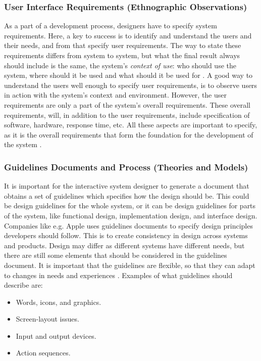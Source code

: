 \subsubsection{User Interface Requirements (Ethnographic Observations)}   
As a part of a development process, designers have to specify system requirements. Here, a key to success is to identify and understand the users and their needs, and from that specify user requirements. The way to state these requirements differs from system to system, but what the final result always should include is the same, the system's \emph{context of use}: who should use the system, where should it be used and what should it be used for \cite{mmi}. A good way to understand the users well enough to specify user requirements, is to observe users in action with the system's context and environment. However, the user requirements are only a part of the system's overall requirements. These overall requirements, will, in addition to the user requirements, include specification of software, hardware, response time, etc. All these aspects are important to specify, as it is the overall requirements that form the foundation for the development of the system \cite{mmi} \cite{systemutviklingDel1}. 

\subsubsection{Guidelines Documents and Process (Theories and Models)}
It is important for the interactive system designer to generate a document that obtains a set of guidelines which specifies how the design should be. This could be design guidelines for the whole system, or it can be design guidelines for parts of the system, like functional design, implementation design, and interface design. Companies like e.g. Apple uses guidelines documents to specify design principles developers should follow. This is to create consistency in design across systems and products. Design may differ as different systems have different needs, but there are still some elements that should be considered in the guidelines document. It is important that the guidelines are flexible, so that they can adapt to changes in needs and experiences \cite{mmi}. Examples of what guidelines should describe are:

\begin{itemize}
\renewcommand{\labelitemi}{$\bullet$}
\item Words, icons, and graphics.
\item Screen-layout issues.
\item Input and output devices.
\item Action sequences.
\end{itemize}


